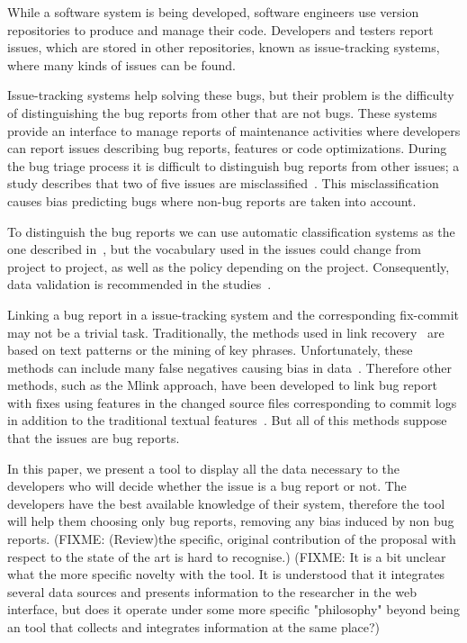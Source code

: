 \documentclass[runningheads,a4paper]{llncs}
\begin{document}
While a software system is being developed, software engineers use version repositories to produce and manage their code. Developers and testers report issues, which are stored in other repositories, known as issue-tracking systems, where many kinds of issues can be found.

Issue-tracking systems help solving these bugs, but their problem is the difficulty of distinguishing the bug reports from other that are not bugs. These systems provide an interface to manage reports of maintenance activities where developers can report issues describing bug reports, features or code optimizations. During the bug triage process it is difficult to distinguish bug reports from other issues; a study describes that two of five issues are misclassified~\cite{Herzig}. This misclassification causes bias predicting bugs where non-bug reports are taken into account.

To distinguish the bug reports we can use automatic classification systems as the one described in~\cite{Antoniol}, but the vocabulary used in the issues could change from project to project, as well as the policy depending on the project. Consequently, data validation is recommended in the studies~\cite{Herzig}.

Linking a bug report in a issue-tracking system and the corresponding fix-commit may not be a trivial task. Traditionally, the methods used in link recovery~\cite{Zimmermann, Thomas} are based on text patterns or the mining of key phrases. Unfortunately, these methods can include many false negatives causing bias in data~\cite{Bird, NguyenTH}. Therefore other methods, such as the Mlink approach, have been developed to link bug report with fixes using features in the changed source files corresponding to commit logs in addition to the traditional textual features~\cite{Nguyen}. But all of this methods suppose that the issues are bug reports.

In this paper, we present a tool to display all the data necessary to the developers who will decide whether the issue is a bug report or not. The developers have the best available knowledge of their system, therefore the tool will help them choosing only bug reports, removing any bias induced by non bug reports. (FIXME: (Review)the specific, original contribution of the proposal with respect to the state of the art is hard to recognise.)
(FIXME:  It is a bit unclear what the more specific novelty with the tool. It is understood that it integrates several data sources and presents information to the researcher in the web interface, but does it operate under some more specific "philosophy" beyond being an tool that collects and integrates information at the same place?)
\end{document}
